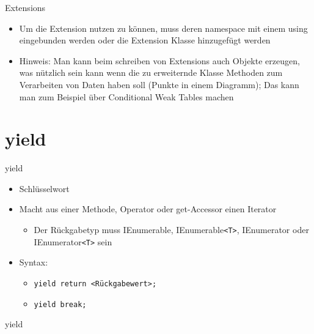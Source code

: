 \begin{frame}{Extensions}
	\begin{itemize}
		\item Um die Extension nutzen zu können, muss deren \alert{namespace} mit einem \alert{using} eingebunden werden oder die Extension Klasse hinzugefügt werden 
	\end{itemize}
	
	
	\begin{itemize}
		\item Hinweis: Man kann beim schreiben von Extensions auch Objekte erzeugen, was nützlich sein kann wenn die zu erweiternde Klasse Methoden zum Verarbeiten von Daten haben soll (Punkte in einem Diagramm); Das kann man zum Beispiel über Conditional Weak Tables machen 
	\end{itemize}		
	
\end{frame}

\section{yield}
\begin{frame}{yield}
	\begin{itemize}
		\item Schlüsselwort
		\item Macht aus einer Methode, Operator oder get-Accessor einen Iterator
		\begin{itemize}
			\item Der Rückgabetyp muss \alert{IEnumerable}, \alert{IEnumerable\texttt{<T>}}, \alert{IEnumerator} oder \alert{IEnumerator\texttt{<T>}} sein
		\end{itemize}
		\item Syntax:
		\begin{itemize}
			\item \texttt{\alert{yield} return \alert{<Rückgabewert>};}
			\item \texttt{\alert{yield} break;}
		\end{itemize}
	\end{itemize}
\end{frame}

\begin{frame}{yield}
	
	
\end{frame}

